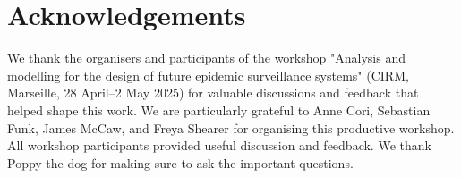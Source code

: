 \documentclass{article}
\begin{document}
\section{Acknowledgements}

We thank the organisers and participants of the workshop "Analysis and modelling for the design of future epidemic surveillance systems" (CIRM, Marseille, 28 April–2 May 2025) for valuable discussions and feedback that helped shape this work.
We are particularly grateful to Anne Cori, Sebastian Funk, James McCaw, and Freya Shearer for organising this productive workshop.
All workshop participants provided useful discussion and feedback.
We thank Poppy the dog for making sure to ask the important questions.



\end{document}
